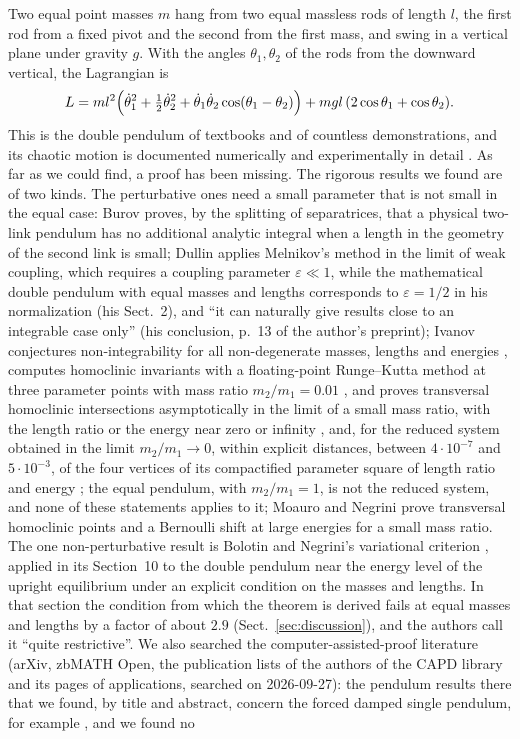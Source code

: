 \documentclass[11pt]{article}
\theoremstyle{definition}
\begin{document}
Two equal point masses $m$ hang from two equal massless rods of length $l$, the first rod from a fixed pivot and the second from the first mass, and swing in a vertical plane under gravity $g$. With the angles $\theta_1, \theta_2$ of the rods from the downward vertical, the Lagrangian is
\begin{equation}\label{eq:lag}
  L = ml^2\Bigl(\dot\theta_1^2 + \tfrac12\dot\theta_2^2 + \dot\theta_1\dot\theta_2\cos(\theta_1 - \theta_2)\Bigr) + mgl\,(2\cos\theta_1 + \cos\theta_2).
\end{equation}
This is the double pendulum of textbooks and of countless demonstrations, and its chaotic motion is documented numerically and experimentally in detail \cite{rs1984, sgwy1992, so2006, kbkb2023}. As far as we could find, a proof has been missing. The rigorous results we found are of two kinds. The perturbative ones need a small parameter that is not small in the equal case: Burov \cite{burov1986} proves, by the splitting of separatrices, that a physical two-link pendulum has no additional analytic integral when a length in the geometry of the second link is small; Dullin \cite{dullin1994} applies Melnikov's method in the limit of weak coupling, which requires a coupling parameter $\varepsilon \ll 1$, while the mathematical double pendulum with equal masses and lengths corresponds to $\varepsilon = 1/2$ in his normalization (his Sect.~2), and ``it can naturally give results close to an integrable case only'' (his conclusion, p.~13 of the author's preprint); Ivanov conjectures non-integrability for all non-degenerate masses, lengths and energies \cite[p.~105]{ivanov1}, computes homoclinic invariants with a floating-point Runge--Kutta method at three parameter points with mass ratio $m_2/m_1 = 0.01$ \cite{ivanov1}, and proves transversal homoclinic intersections asymptotically in the limit of a small mass ratio, with the length ratio or the energy near zero or infinity \cite{ivanov2, ivanov3}, and, for the reduced system obtained in the limit $m_2/m_1 \to 0$, within explicit distances, between $4\cdot10^{-7}$ and $5\cdot10^{-3}$, of the four vertices of its compactified parameter square of length ratio and energy \cite[Main Theorem, p.~54]{ivanov4}; the equal pendulum, with $m_2/m_1 = 1$, is not the reduced system, and none of these statements applies to it; Moauro and Negrini \cite{mn1998} prove transversal homoclinic points and a Bernoulli shift at large energies for a small mass ratio. The one non-perturbative result is Bolotin and Negrini's variational criterion \cite{bn1997}, applied in its Section~10 to the double pendulum near the energy level of the upright equilibrium under an explicit condition on the masses and lengths. In that section the condition from which the theorem is derived fails at equal masses and lengths by a factor of about $2.9$ (Sect.~\ref{sec:discussion}), and the authors call it ``quite restrictive''. We also searched the computer-assisted-proof literature (arXiv, zbMATH Open, the publication lists of the authors of the CAPD library and its pages of applications, searched on 2026-09-27): the pendulum results there that we found, by title and abstract, concern the forced damped single pendulum, for example \cite{wz2009}, and we found no 
\end{document}
